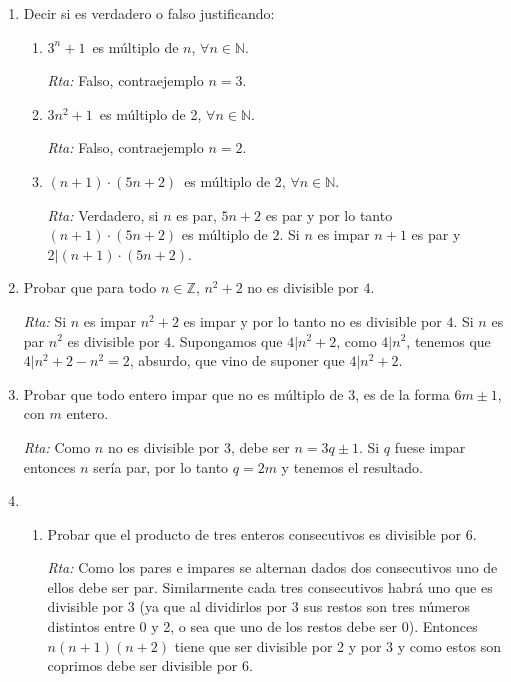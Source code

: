 \documentclass[a4paper,12pt,twoside,spanish,reqno]{amsbook}
\numberwithin{equation}{section}
\newcommand{\rta}{\noindent\textit{Rta: }}
\begin{document}
\begin{enumerate}
\begin{enumerate}
\end{enumerate}



\item Decir si es verdadero o falso justificando:
\begin{enumerate}
    \item $3^n+1$\, es múltiplo de $n$, $\forall n \in {\mathbb N}$.
    
    \rta Falso, contraejemplo $n=3$.
    
    \item $3n^2+1$\, es múltiplo de 2, $\forall n \in {\mathbb N}$.
    
    \rta Falso, contraejemplo $n=2$.
    
    \item $(n+1)\cdot (5n+2)$\, es múltiplo de 2, $\forall n \in {\mathbb N}$.
    
    \rta Verdadero, si $n$ es par,  $5n+2$ es par y por lo tanto $(n + 1) \cdot (5n + 2)$ es múltiplo de $2$.    Si $n$ es impar $n+1$ es par y $2\vert (n + 1) \cdot (5n + 2)$.
\end{enumerate}



\item Probar que para todo $n \in {\mathbb Z}$, $n^2 + 2$ no es divisible por $4$.

\rta Si $n$ es impar $n^2+2$ es impar y por lo tanto no es divisible por $4$.
Si $n$ es par $n^2$ es divisible por $4$. Supongamos que $4| n^2+2$,  como $4|n^2$, tenemos que  $4| n^2+2- n^2 = 2$,  absurdo,  que vino de suponer que  $4| n^2+2$.


\item Probar que todo entero impar que no es múltiplo de 3, es de la forma $6m\pm 1$, con $m$ entero.

\rta Como $n$ no es divisible por 3, debe ser $n=3q\pm1$. Si $q$ fuese impar entonces $n$ sería par, por lo tanto $q=2m$  y tenemos el resultado.



\item 
\begin{enumerate}
    \item Probar que el producto de tres enteros consecutivos es divisible por 6.
    
    \rta Como los pares e impares se alternan dados dos consecutivos uno de ellos debe ser par. 
    Similarmente cada tres consecutivos habrá uno que es divisible por 3 (ya que al dividirlos por 3 sus restos son tres números distintos entre 0 y 2, o sea que uno de los restos debe ser 0). Entonces $n(n+1)(n+2)$ tiene que ser divisible por 2 y por 3 y como estos son coprimos debe ser divisible por 6.
    

\end{enumerate}
\end{enumerate}
\end{document}
